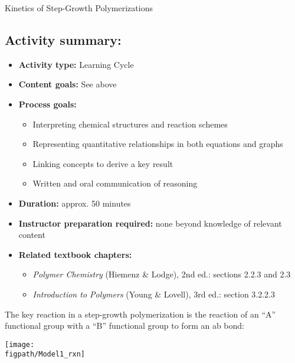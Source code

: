 \begin{activity}{Kinetics of Step-Growth Polymerizations}
\begin{instructornotes}
	\subsection*{Activity summary:}
	\begin{itemize}
		\item \textbf{Activity type:} Learning Cycle
		\item \textbf{Content goals:} See above
		\item \textbf{Process goals:} %
			\begin{itemize}
				\item Interpreting chemical structures and reaction schemes
				\item Representing quantitative relationships in both equations and graphs
				\item Linking concepts to derive a key result
				\item Written and oral communication of reasoning
			\end{itemize}
		\item \textbf{Duration:} approx. 50 minutes
		\item \textbf{Instructor preparation required:} none beyond knowledge of relevant content
		\item \textbf{Related textbook chapters:}
			\begin{itemize}
				\item \emph{Polymer Chemistry} (Hiemenz \& Lodge), 2nd ed.: sections 2.2.3 and 2.3
				\item \emph{Introduction to Polymers} (Young \& Lovell), 3rd ed.: section 3.2.2.3
			\end{itemize}
	\end{itemize}

\end{instructornotes}


\begin{model}
\label{\labelbase:mdl:simple}

	The key reaction in a step-growth polymerization is the reaction of an ``A'' functional group with a ``B'' functional group to form an ab bond:
	
	\centerline{\texttt{[image: \\figpath/Model1\_rxn]}}
	

\end{model}
\end{activity}
